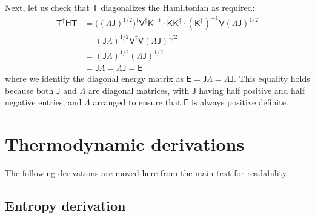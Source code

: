\documentclass[aps, prx, nofootinbib, superscriptaddress]{revtex4-2}
\begin{document}
Next, let us check that $\mathsf{T}$ diagonalizes the Hamiltonian as required:
\begin{align*}
    \mathsf{T}^{\dagger} \mathsf{HT}
    &= \big( \mathsf{(\Lambda J)}^{1/2} \big)^{\dagger} \mathsf{V}^{\dagger} \mathsf{K}^{-1} \cdot \mathsf{KK}^{\dagger} \cdot (\mathsf{K}^{\dagger})^{-1} \mathsf{V} \mathsf{(\Lambda J)}^{1/2} \\
    &= \mathsf{(J\Lambda)}^{1/2} \mathsf{V}^{\dagger} \mathsf{V} \mathsf{(\Lambda J)}^{1/2} \\
    &= \mathsf{(J\Lambda)}^{1/2} \mathsf{(\Lambda J)}^{1/2} \\
    &= \mathsf{J\Lambda} = \mathsf{\Lambda J} = \mathsf{E}
\end{align*}
where we identify the diagonal energy matrix as $\mathsf{E} = \mathsf{J\Lambda} = \mathsf{\Lambda J}$. This equality holds because both $\mathsf{J}$ and $\mathsf{\Lambda}$ are diagonal matrices, with $\mathsf{J}$ having half positive and half negative entries, and $\mathsf{\Lambda}$ arranged to ensure that $\mathsf{E}$ is always positive definite.







\section{Thermodynamic derivations}\label{app:thermo-derivations}

The following derivations are moved here from the main text for readability.

\subsection*{Entropy derivation}
\end{document}

